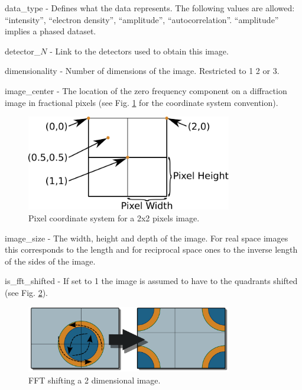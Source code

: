 \documentclass[usletter,11pt]{article}
\newcommand{\member}[2]
{ \noindent
{ \color{softBlue}  #1 - } #2
\vspace{0.2cm}
}
\begin{document}
\member{data\_type}{Defines what the data represents. The following
  values are allowed: ``intensity'', ``electron density'',
  ``amplitude'', ``autocorrelation''. ``amplitude'' implies a phased dataset.}

\member{detector\_$N$}{Link to the detectors used to obtain this
image.}

\member{dimensionality}{Number of dimensions of the image. Restricted to 1 2 or 3.}

\member{image\_center}{The location of the zero frequency component on
 a diffraction image in fractional pixels  (see
 Fig. \ref{fig:pixel_coordinates} for the coordinate system convention).

\begin{figure}[h!]
\centering
\includegraphics[width=0.8\textwidth]{pixel_coordinates.pdf}
\caption{Pixel coordinate system for a 2x2 pixels image.}
\label{fig:pixel_coordinates}
\end{figure}
}


\member{image\_size}{The width, height and depth of the image. For
  real space images this corresponds to the length and for reciprocal
  space ones to the inverse length of the sides of the image.}

\member{is\_fft\_shifted}{If set to 1 the image is assumed to have to
  the quadrants shifted (see Fig. \ref{fig:fft_shift}).

\begin{figure}[h!]
\centering
\includegraphics[width=0.8\textwidth]{fft_shift.pdf}
\caption{FFT shifting a 2 dimensional image.}
\label{fig:fft_shift}
\end{figure}
}
\end{document}
